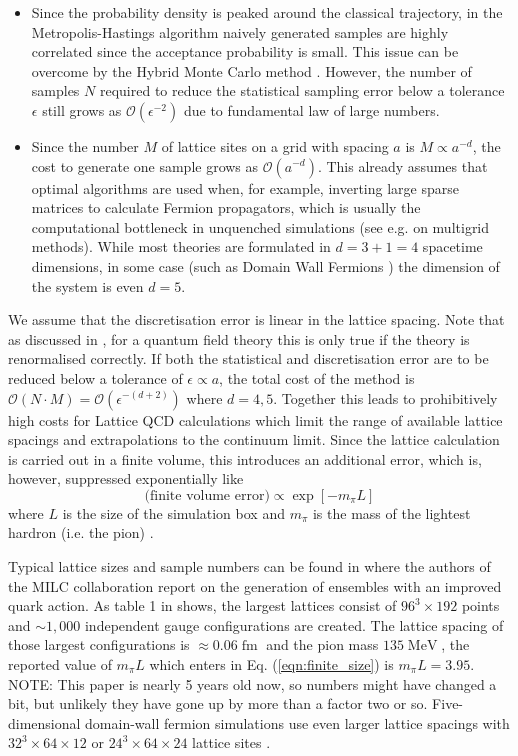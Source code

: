 \documentclass[11pt]{article}
\newcommand{\cblue}[1]{{\color{blue}#1}}
\newcommand{\note}[1]{\cblue{NOTE: #1}}
\begin{document}
\begin{itemize}
\item Since the probability density is peaked around the classical trajectory, in the Metropolis-Hastings algorithm naively generated samples are highly correlated since the acceptance probability is small. This issue can be overcome by the Hybrid Monte Carlo method \cite{Duane1987}. However, the number of samples $N$ required to reduce the statistical sampling error below a tolerance $\epsilon$ still grows as $\mathcal{O}(\epsilon^{-2})$ due to fundamental law of large numbers. 
\item Since the number $M$ of lattice sites on a grid with spacing $a$ is $M \propto a^{-d}$, the cost to generate one sample grows as $\mathcal{O}(a^{-d})$. This already assumes that optimal algorithms are used when, for example, inverting large sparse matrices to calculate Fermion propagators, which is usually the computational bottleneck in unquenched simulations (see e.g. \cite{Brannick2008} on multigrid methods). While most theories are formulated in $d=3+1=4$ spacetime dimensions, in some case (such as Domain Wall Fermions \cite{Kaplan1992}) the dimension of the system is even $d=5$.
\end{itemize}
We assume that the discretisation error is linear in the lattice spacing. Note that as discussed in \cite{Lepage1994}, for a quantum field theory this is only true if the theory is renormalised correctly. If both the statistical and discretisation error are to be reduced below a tolerance of $\epsilon\propto a$, the total cost of the method is \mbox{$\mathcal{O}(N\cdot M) = \mathcal{O}(\epsilon^{-(d+2)})$} where $d=4,5$. Together this leads to prohibitively high costs for Lattice QCD calculations which limit the range of available lattice spacings and extrapolations to the continuum limit. Since the lattice calculation is carried out in a finite volume, this introduces an additional error, which is, however, suppressed exponentially like
\begin{equation}
  \text{(finite volume error)} \propto \exp\left[-m_\pi L\right]\label{eqn:finite_size}
\end{equation}
where $L$ is the size of the simulation box and $m_\pi$ is the mass of the lightest hardron (i.e. the pion) \cite{Lepage1994}.

Typical lattice sizes and sample numbers can be found in \cite{Bazavov2013} where the authors of the MILC collaboration report on the generation of ensembles with an improved quark action. As table 1 in \cite{Bazavov2013} shows, the largest lattices consist of $96^3\times 192$ points and $\sim 1,000$ independent gauge configurations are created. The lattice spacing of those largest configurations is $\approx 0.06\operatorname{fm}$ and the pion mass $135 \operatorname{MeV}$, the reported value of $m_\pi L$ which enters in Eq. (\ref{eqn:finite_size}) is $m_\pi L=3.95$.
\note{This paper is nearly 5 years old now, so numbers might have changed a bit, but unlikely they have gone up by more than a factor two or so.}
Five-dimensional domain-wall fermion simulations use even larger lattice spacings with $32^3\times 64\times 12$ or $24^3\times 64\times 24$ lattice sites \cite{Jung2017}.
\end{document}
